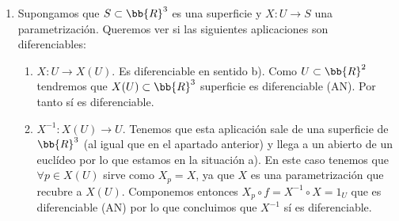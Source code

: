 \begin{ejemplo}
\begin{enumerate}
        Una consecuencia de esto es que solo necesitaremos demostrar la diferenciabilidad en el sentido a) para un recubrimiento, en lugar de para toda parametrización.

        \item Supongamos que $S\subset \bb{R}^3$ es una superficie y $X:U\to S$ una parametrización. Queremos ver si las siguientes aplicaciones son diferenciables:
        \begin{enumerate}
            \item $X:U\to X(U)$. Es diferenciable en sentido b). Como $U\subset \bb{R}^2$ tendremos que $X(U)\subset \bb{R}^3$ superficie es diferenciable (AN). Por tanto sí es diferenciable.
            \item $X^{-1}:X(U)\to U$. Tenemos que esta aplicación sale de una superficie de $\bb{R}^3$ (al igual que en el apartado anterior) y llega a un abierto de un euclídeo por lo que estamos en la situación a). En este caso tenemos que $\forall p \in X(U)$ sirve como $X_p=X$, ya que $X$ es una parametrización que recubre a $X(U)$. Componemos entonces $X_p\circ f = X^{-1}\circ X = 1_U$ que es diferenciable (AN) por lo que concluimos que $X^{-1}$ sí es diferenciable.
        \end{enumerate}     
    \end{enumerate}
\end{ejemplo}

